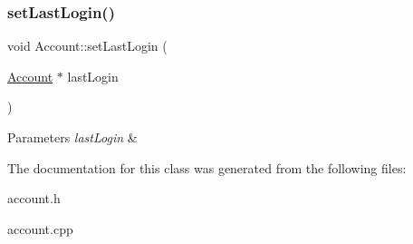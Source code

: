 \subsubsection{\texorpdfstring{set\+Last\+Login()}{setLastLogin()}}
{\footnotesize\ttfamily void Account\+::set\+Last\+Login (\begin{DoxyParamCaption}\item[{\hyperlink{class_account}{Account} $\ast$}]{last\+Login }\end{DoxyParamCaption})}


\begin{DoxyParams}{Parameters}
{\em last\+Login} & \\
\hline
\end{DoxyParams}


The documentation for this class was generated from the following files\+:\begin{DoxyCompactItemize}
\item 
account.\+h\item 
account.\+cpp\end{DoxyCompactItemize}
